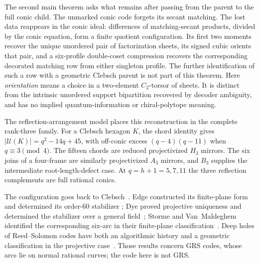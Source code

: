 \documentclass[11pt]{article}
\theoremstyle{definition}
\theoremstyle{remark}
\newcommand{\cU}{\mathcal{U}}
\begin{document}
The second main theorem asks what remains after passing from the parent to
the full conic child.  The unmarked conic code forgets its secant matching.
The lost data reappears in the conic ideal: differences of matching-secant
products, divided by the conic equation, form a finite quotient
configuration.  Its first two moments recover the unique unordered pair of
factorization sheets, its signed cubic orients that pair, and a six-profile
double-coset compression recovers the corresponding decorated matching row
from either singleton profile.  The further identification of such a row
with a geometric Clebsch parent is not part of this theorem.  Here
\emph{orientation} means a choice in a two-element
$C_2$-torsor of sheets.  It is distinct from the intrinsic unordered
support bipartition recovered by decoder ambiguity, and has no implied
quantum-information or chiral-polytope meaning.

The reflection-arrangement model places this reconstruction in the complete
rank-three family.  For a Clebsch hexagon $K$, the chord identity gives
$|\cU(K)|=q^2-14q+45$, with off-conic excess $(q-4)(q-11)$ when
$q\equiv3\pmod4$.  The fifteen chords are reduced projectivized $H_3$
mirrors.  The six joins of a four-frame are similarly projectivized $A_3$
mirrors, and $B_3$ supplies the intermediate root-length-defect case.  At
$q=h+1=5,7,11$ the three reflection complements are full rational conics.

The configuration goes back to Clebsch~\cite[p.~336]{Clebsch1871}. Edge
constructed its finite-plane form and determined its order-$60$ stabilizer
\cite[\S\S29--32]{Edge1956}; Dye proved projective uniqueness and determined
the stabilizer over a general field~\cite[Theorems~1 and 3,
pp.~275--278]{Dye1991}; Storme and Van~Maldeghem identified the corresponding
six-arc in their finite-plane classification~\cite{SVM1995}. Deep holes of
Reed--Solomon codes have both an algorithmic history
\cite{GuruswamiVardy2005,ChengMurray2007} and a geometric classification in
the projective case~\cite{ZWK2020}. Those results concern GRS codes, whose
arcs lie on normal rational curves; the code here is not GRS.
\end{document}

